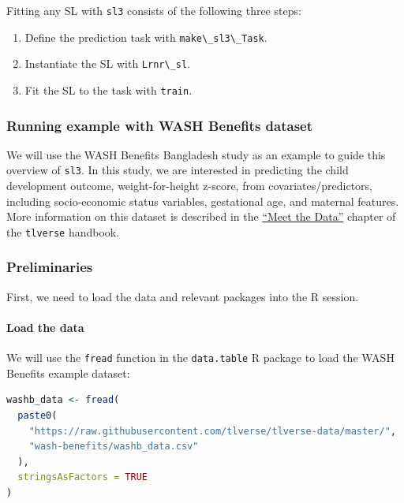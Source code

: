 \documentclass[
  12pt, krantz2,
]{krantz}
\newcommand{\passthrough}[1]{#1}
\providecommand{\tightlist}{%
  \setlength{\itemsep}{0pt}\setlength{\parskip}{0pt}}
\newcommand{\1}{\mathbbm{1}}
\theoremstyle{definition}
\theoremstyle{definition}
\theoremstyle{definition}
\theoremstyle{definition}
\theoremstyle{remark}
\begin{document}
Fitting any SL with \passthrough{\lstinline!sl3!} consists of the following three steps:

\begin{enumerate}
\def\labelenumi{\arabic{enumi}.}
\tightlist
\item
  Define the prediction task with \passthrough{\lstinline!make\_sl3\_Task!}.
\item
  Instantiate the SL with \passthrough{\lstinline!Lrnr\_sl!}.
\item
  Fit the SL to the task with \passthrough{\lstinline!train!}.
\end{enumerate}

\hypertarget{running-example-with-wash-benefits-dataset}{%
\subsubsection*{Running example with WASH Benefits dataset}\label{running-example-with-wash-benefits-dataset}}


We will use the WASH Benefits Bangladesh study as an example to guide this
overview of \passthrough{\lstinline!sl3!}. In this study, we are interested in predicting the child
development outcome, weight-for-height z-score, from covariates/predictors,
including socio-economic status variables, gestational age, and maternal
features. More information on this dataset is described in the \href{https://tlverse.org/tlverse-handbook/data.html\#wash}{``Meet the
Data''} chapter of the
\passthrough{\lstinline!tlverse!} handbook.

\hypertarget{preliminaries}{%
\subsubsection*{Preliminaries}\label{preliminaries}}


First, we need to load the data and relevant packages into the R session.

\hypertarget{load-the-data}{%
\paragraph*{Load the data}\label{load-the-data}}

We will use the \passthrough{\lstinline!fread!} function in the \passthrough{\lstinline!data.table!} R package to load the WASH
Benefits example dataset:

\begin{lstlisting}[language=R]
washb_data <- fread(
  paste0(
    "https://raw.githubusercontent.com/tlverse/tlverse-data/master/",
    "wash-benefits/washb_data.csv"
  ),
  stringsAsFactors = TRUE
)
\end{lstlisting}
\end{document}
